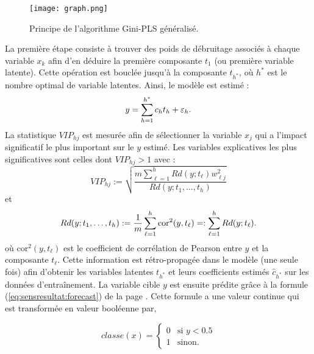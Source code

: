 \begin{figure}[!htb]
	\centering
	\texttt{[image: graph.png]}
	\caption{Principe de l'algorithme  Gini-PLS généralisé.}
\end{figure}


La première étape consiste à trouver des poids de débruitage associés à chaque variable $x_k$ afin d'en déduire la première composante $t_1$ (ou première variable latente). Cette opération est bouclée jusqu'à la composante $t_{h^*}$, où $h^*$ est le nombre optimal de variable latentes. Ainsi, le modèle est estimé :
\begin{equation}\label{eq:sensresultat:forecast}
y=\sum_{h=1}^{h^*} c_ht_h +\varepsilon_h.
\end{equation} 
La statistique $VIP_{hj}$ est mesurée afin de sélectionner la variable $x_j$ qui a l'impact significatif le plus important sur le $y$ estimé. Les variables explicatives les plus significatives sont celles dont $VIP_{hj}>1$ avec :
\[
VIP_{hj} := \sqrt{\frac{m\sum_{\ell=1}^{h}Rd(y;t_\ell)w_{\ell j}^2}{Rd(y;t_1,\ldots,t_h)}} 
\] 
et 
\[
Rd(y; t_1,\ldots,t_h) := \frac{1}{m}\sum_{\ell=1}^{h}\text{cor}^2(y,t_\ell) =: \sum_{\ell=1}^{h}Rd(y;t_\ell).
\]
où $\text{cor}^2(y,t_\ell)$ est le coefficient de corrélation de Pearson entre $y$ et la composante $t_\ell$. Cette information est rétro-propagée dans le modèle (une seule fois) afin d'obtenir les variables latentes $t_{h^*}$ et leurs coefficients estimés $\hat{c}_{h^*}$ sur les données d'entraînement. La variable cible $y$ est ensuite prédite grâce à la formule  (\ref{eq:sensresultat:forecast}) de la page \pageref{eq:sensresultat:forecast}. %
{Cette formule a une valeur continue qui est transformée en valeur booléenne par,}

\[classe(x) = \left\{\begin{array}{ll}
	0 & \text{si } y < 0.5 \\
	1 & \text{sinon}.\end{array}\right.\]



